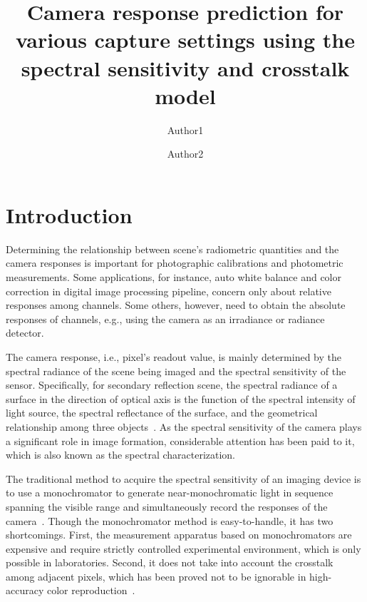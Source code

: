 \documentclass[9pt,twocolumn,twoside]{osajnl}
\title{Camera response prediction for various capture settings using the spectral sensitivity and crosstalk model}
\author[1]{Author1}
\author[1,*]{Author2}
\affil[1]{State Key Laboratory of Modern Optical Instrumentation, College of Optical Science and Engineering, Zhejiang University, Hangzhou 310027, China}
\affil[*]{Corresponding author: xxx@zju.edu.cn}
\begin{document}
	
	\maketitle
	\thispagestyle{fancy}
	
	
	\section{Introduction}
	
	Determining the relationship between scene’s radiometric quantities and the camera responses is important for photographic calibrations and photometric measurements. Some applications, for instance, auto white balance and color correction in digital image processing pipeline, concern only about relative responses among channels. Some others, however, need to obtain the absolute responses of channels, e.g., using the camera as an irradiance or radiance detector.
	
	The camera response, i.e., pixel’s readout value, is mainly determined by the spectral radiance of the scene being imaged and the spectral sensitivity of the sensor. Specifically, for secondary reflection scene, the spectral radiance of a surface in the direction of optical axis is the function of the spectral intensity of light source, the spectral reflectance of the surface, and the geometrical relationship among three objects~\cite{Horn:79}. As the spectral sensitivity of the camera plays a significant role in image formation, considerable attention has been paid to it, which is also known as the spectral characterization.
	
	The traditional method to acquire the spectral sensitivity of an imaging device is to use a monochromator to generate near-monochromatic light in sequence spanning the visible range and simultaneously record the responses of the camera~\cite{Darrodi:15}. Though the monochromator method is easy-to-handle, it has two shortcomings. First, the measurement apparatus based on monochromators are expensive and require strictly controlled experimental environment, which is only possible in laboratories. Second, it does not take into account the crosstalk among adjacent pixels, which has been proved not to be ignorable in high-accuracy color reproduction~\cite{Getman:07}.
	
\end{document}

